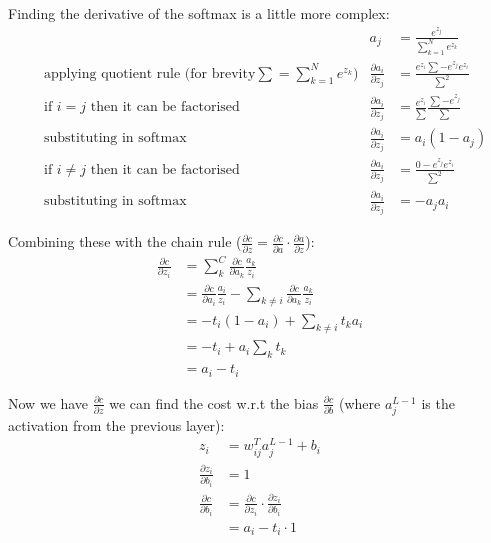 Finding the derivative of the softmax is a little more complex:
\begin{equation}
    \begin{aligned}
        &       &   a_{j} &= \frac{e^{z_{j}}}{\sum_{k=1}^{N} e^{z_{k}}} \\
        &\text{applying quotient rule (for brevity} \sum = \sum_{k=1}^{N} e^{z_{k}} \text{)}   &   \frac{\partial a_{i}}{\partial z_{j}} &= \frac{e^{z_{i}} \sum - e^{z_{j}}e^{z_{i}}}{\sum^{2}}\\[2em]
        &\text{if } i=j \text{ then it can be factorised}     &   \frac{\partial a_{i}}{\partial z_{j}} &= \frac{e^{z_{i}}}{\sum} \frac{\sum - e^{z_{j}}}{\sum}\\
        &\text{substituting in softmax}     &   \frac{\partial a_{i}}{\partial z_{j}} &= a_{i} (1 - a_{j})\\[2em]
        &\text{if } i \neq j \text{ then it can be factorised}      &   \frac{\partial a_{i}}{\partial z_{j}} &= \frac{0 - e^{z_{j}}e^{z_{i}}}{\sum^{2}}\\
        &\text{substituting in softmax}     &   \frac{\partial a_{i}}{\partial z_{j}} &= -a_{j}a_{i}
    \end{aligned}
\end{equation}

Combining these with the chain rule (\(\frac{\partial c}{\partial z} = \frac{\partial c}{\partial a} \cdot \frac{\partial a}{\partial z}\)):
\begin{equation}
    \begin{aligned}
        \frac{\partial c}{\partial z_{i}} &= \sum_{k}^{C} \frac{\partial c}{\partial a_{k}} \frac{a_{k}}{z_{i}}\\
        &= \frac{\partial c}{\partial a_{i}} \frac{a_{i}}{z_{i}} - \sum_{k \neq i} \frac{\partial c}{\partial a_{k}} \frac{a_{k}}{z_{i}}\\
        &= - t_{i}(1 - a_{i}) + \sum_{k \neq i} t_{k}a_{i}\\
        &= - t_{i} + a_{i} \sum_{k} t_{k}\\
        &= a_{i} - t_{i}
    \end{aligned}
\end{equation}

Now we have \(\frac{\partial c}{\partial z}\) we can find the cost w.r.t the
bias \(\frac{\partial c}{\partial b}\) (where \( a_{j}^{L-1} \) is the activation from the previous layer):
\begin{equation}
    \begin{aligned}
        z_{i} &= w_{ij}^{T}a_{j}^{L-1} + b_{i}\\
        \frac{\partial z_{i}}{\partial b_{i}} &= 1\\[2em]
        \frac{\partial c}{\partial b_{i}} &= \frac{\partial c}{\partial z_{i}} \cdot \frac{\partial z_{i}}{\partial b_{i}}\\
        &= a_{i} - t_{i} \cdot 1
    \end{aligned}
\end{equation}

